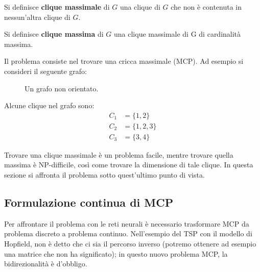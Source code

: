 \begin{mydef}
	Si definisce \textbf{clique massimale} di $G$ una clique di $G$ che non è contenuta in nessun'altra clique di $G$.    
\end{mydef}

\begin{mydef}
	Si definisce \textbf{clique massima} di $G$ una clique massimale di G di cardinalità massima.
\end{mydef}
Il problema consiste nel trovare una cricca massimale (MCP). Ad esempio si consideri il seguente grafo:

\begin{figure}[h!]
	\centering
	\caption{Un grafo non orientato.}\label{fig:graph1}
\end{figure}
Alcune clique nel grafo sono:
\begin{align*}
	C_1 &= \{1,2\} \tag{$C_1$ non è massimale perché $C_1 \subseteq C_2$}\\
	C_2 &= \{1,2,3\} \tag{Massimale e massima}\\
	C_3 &= \{3,4\} \tag{Massimale}
\end{align*}

\newpage

Trovare una clique massimale è un problema facile, mentre trovare quella massima è NP-difficile, così come trovare la dimensione di tale clique. In questa sezione si affronta il problema sotto quest'ultimo punto di vista.

\subsection{Formulazione continua di MCP} %
Per affrontare il problema con le reti neurali è necessario trasformare MCP da problema discreto a problema continuo. Nell'esempio del TSP con il modello di Hopfield, non è detto che ci sia il percorso inverso (potremo ottenere ad esempio una matrice che non ha significato); in questo nuovo problema MCP, la bidirezionalità è d'obbligo.\\

